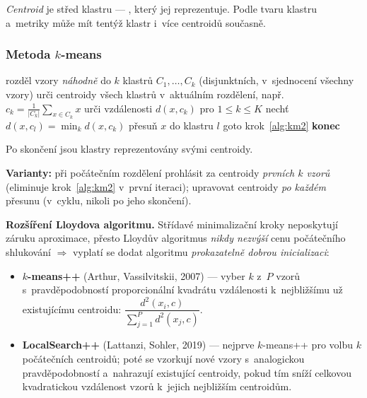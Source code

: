\documentclass[11pt,a4paper]{article}
\theoremstyle{definition}
\begin{document}
\emph{Centroid} je střed klastru --- , který jej reprezentuje. Podle tvaru klastru
a~metriky může mít tentýž klastr i~více centroidů současně.

\subsubsection{Metoda $k$-means}

\begin{defbox}
\begin{algorithmic}[1]
\State rozděl vzory \emph{náhodně} do $k$ klastrů $C_1,\dots,C_k$ (disjunktních, v~sjednocení
       všechny vzory)
\State \label{alg:km2} urči centroidy všech klastrů v~aktuálním rozdělení,
       např.\ $c_k=\frac{1}{|C_k|}\sum_{x\in C_k}x$
   \State urči vzdálenosti $d(x,c_k)$ pro $1\le k\le K$
   \State nechť $d(x,c_l)=\min_k d(x,c_k)$
    \State přesuň $x$ do klastru $l$ \EndIf
\EndFor
{} \State goto krok~\ref{alg:km2} \Else \State \textbf{konec} \EndIf
\end{algorithmic}
Po skončení jsou klastry reprezentovány svými centroidy.

\textbf{Varianty:} při počátečním rozdělení prohlásit za centroidy \emph{prvních $k$ vzorů}
(eliminuje krok~\ref{alg:km2} v~první iteraci); upravovat centroidy \emph{po každém}
přesunu (v~cyklu, nikoli po jeho skončení).
\end{defbox}

\textbf{Rozšíření Lloydova algoritmu.} Střídavé minimalizační kroky neposkytují záruku
aproximace, přesto Lloydův algoritmus \emph{nikdy nezvýší} cenu počátečního shlukování
$\Rightarrow$ vyplatí se dodat algoritmu \emph{prokazatelně dobrou inicializaci}:
\begin{itemize}
\item \textbf{$k$-means++} (Arthur, Vassilvitskii, 2007) --- vyber $k$ z~$P$ vzorů
      s~pravděpodobností proporcionální kvadrátu vzdálenosti k~nejbližšímu už existujícímu
      centroidu:
      $\dfrac{d^2(x_i,c)}{\sum_{j=1}^{P}d^2(x_j,c)}$.
\item \textbf{LocalSearch++} (Lattanzi, Sohler, 2019) --- nejprve $k$-means++ pro volbu $k$
      počátečních centroidů; poté se vzorkují nové vzory s~analogickou pravděpodobností
      a~nahrazují existující centroidy, pokud tím sníží celkovou kvadratickou vzdálenost
      vzorů k~jejich nejbližším centroidům.
\end{itemize}
\end{document}
